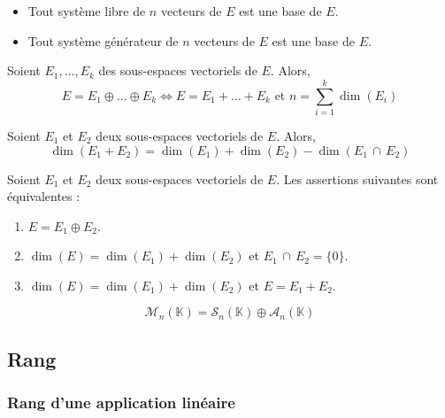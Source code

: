   \begin{proposition}
    \begin{itemize}
      \item Tout système libre de $n$ vecteurs de $E$ est une base de $E$.
      \item Tout système générateur de $n$ vecteurs de $E$ est une base de $E$.
    \end{itemize}
  \end{proposition}

  \begin{proposition}
    Soient $E_1, \dots, E_k$ des sous-espaces vectoriels de $E$. Alors,
    \[ E = E_1 \oplus \dots \oplus E_k \iff E = E_1 + \dots + E_k \text{ et } n = \sum_{i=1}^{k} \dim(E_i) \]
  \end{proposition}

  \begin{proposition}
    Soient $E_1$ et $E_2$ deux sous-espaces vectoriels de $E$. Alors,
    \[ \dim(E_1 + E_2) = \dim(E_1) + \dim(E_2) - \dim(E_1 \, \cap \, E_2) \]
  \end{proposition}

  \begin{corollary}
    Soient $E_1$ et $E_2$ deux sous-espaces vectoriels de $E$. Les assertions suivantes sont équivalentes :
    \begin{enumerate}[label={\bfseries(\roman*)}]
      \item $E = E_1 \oplus E_2$.
      \item $\dim(E) = \dim(E_1) + \dim(E_2)$ et $E_1 \, \cap \, E_2 = \{ 0 \}$.
      \item $\dim(E) = \dim(E_1) + \dim(E_2)$ et $E = E_1 + E_2$.
    \end{enumerate}
  \end{corollary}


  \begin{example}
    \[ \mathcal{M}_n(\mathbb{K}) = \mathcal{S}_n(\mathbb{K}) \oplus \mathcal{A}_n(\mathbb{K}) \]
  \end{example}

  \subsection{Rang}

  \subsubsection{Rang d'une application linéaire}

